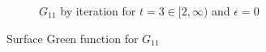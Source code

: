 \begin{figure}[hbt!]
\begin{subfigure}{.5\linewidth}
    \caption{$G_{11}$ by iteration for $t=3 \in [2, \infty)$ and
      $\epsilon = 0$}
  \end{subfigure}
  \caption{Surface Green function for $G_{11}$}
  \label{fig:G11_original}
\end{figure}


